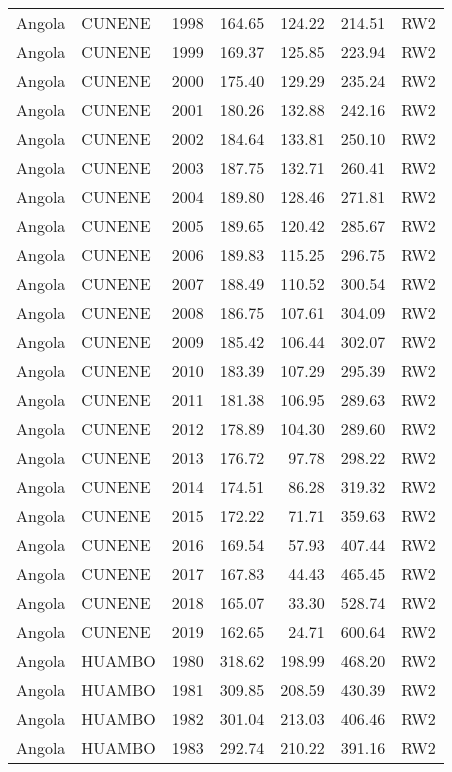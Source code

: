 \begin{longtable}{lllrrrl}
  Angola & CUNENE & 1998 & 164.65 & 124.22 & 214.51 & RW2 \\ 
  Angola & CUNENE & 1999 & 169.37 & 125.85 & 223.94 & RW2 \\ 
  Angola & CUNENE & 2000 & 175.40 & 129.29 & 235.24 & RW2 \\ 
  Angola & CUNENE & 2001 & 180.26 & 132.88 & 242.16 & RW2 \\ 
  Angola & CUNENE & 2002 & 184.64 & 133.81 & 250.10 & RW2 \\ 
  Angola & CUNENE & 2003 & 187.75 & 132.71 & 260.41 & RW2 \\ 
  Angola & CUNENE & 2004 & 189.80 & 128.46 & 271.81 & RW2 \\ 
  Angola & CUNENE & 2005 & 189.65 & 120.42 & 285.67 & RW2 \\ 
  Angola & CUNENE & 2006 & 189.83 & 115.25 & 296.75 & RW2 \\ 
  Angola & CUNENE & 2007 & 188.49 & 110.52 & 300.54 & RW2 \\ 
  Angola & CUNENE & 2008 & 186.75 & 107.61 & 304.09 & RW2 \\ 
  Angola & CUNENE & 2009 & 185.42 & 106.44 & 302.07 & RW2 \\ 
  Angola & CUNENE & 2010 & 183.39 & 107.29 & 295.39 & RW2 \\ 
  Angola & CUNENE & 2011 & 181.38 & 106.95 & 289.63 & RW2 \\ 
  Angola & CUNENE & 2012 & 178.89 & 104.30 & 289.60 & RW2 \\ 
  Angola & CUNENE & 2013 & 176.72 & 97.78 & 298.22 & RW2 \\ 
  Angola & CUNENE & 2014 & 174.51 & 86.28 & 319.32 & RW2 \\ 
  Angola & CUNENE & 2015 & 172.22 & 71.71 & 359.63 & RW2 \\ 
  Angola & CUNENE & 2016 & 169.54 & 57.93 & 407.44 & RW2 \\ 
  Angola & CUNENE & 2017 & 167.83 & 44.43 & 465.45 & RW2 \\ 
  Angola & CUNENE & 2018 & 165.07 & 33.30 & 528.74 & RW2 \\ 
  Angola & CUNENE & 2019 & 162.65 & 24.71 & 600.64 & RW2 \\ 
  Angola & HUAMBO & 1980 & 318.62 & 198.99 & 468.20 & RW2 \\ 
  Angola & HUAMBO & 1981 & 309.85 & 208.59 & 430.39 & RW2 \\ 
  Angola & HUAMBO & 1982 & 301.04 & 213.03 & 406.46 & RW2 \\ 
  Angola & HUAMBO & 1983 & 292.74 & 210.22 & 391.16 & RW2 \\ 

\end{longtable}
